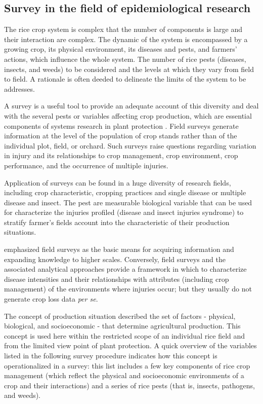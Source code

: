 \subsection*{Survey in the field of epidemiological research}

The rice crop system is complex that the number of components is large and their interaction are complex. The dynamic of the system is encompassed by a growing crop, its physical environment, its diseases and pests, and farmers' actions, which influence the whole system. The number of rice pests (diseases, insects, and weeds) to be considered and the levels at which they vary from field to field. A rationale is often deeded to delineate the limits of the system to be addresses.

A survey is a useful tool to provide an adequate account of this diversity and deal with the several pests or variables affecting crop production, which are essential components of systems research in plant protection \citet{Zadoks_1979_Epidem}. Field surveys generate information at the level of the population of crop stands rather than of the individual plot, field, or orchard. Such surveys raise questions regarding variation in injury and its relationships to crop management, crop environment, crop performance, and the occurrence of multiple injuries.


Application of surveys can be found in a huge diversity of research fields, including crop characteristic, cropping practices and single disease or multiple disease and insect. The pest are measurable biological variable that can be used for characterize the injuries profiled (disease and insect injuries syndrome) to stratify farmer's fields account into the characteristic of their production situations.

\cite{Savary_1995_Use} emphasized field surveys as the basic means for acquiring information and expanding knowledge to higher scales. Conversely, field surveys and the associated analytical approaches provide a framework in which to characterize disease intensities and their relationships with attributes (including crop management) of the environments where injuries occur; but they usually do not generate crop loss data \textit{per se}.


The concept of production situation described the set of factors - physical, biological, and socioeconomic - that determine agricultural production. This concept is used here within the restricted scope of an individual rice field and from the limited view point of plant protection. A quick overview of the variables listed in the following survey procedure indicates how this concept is operationalized in a survey: this list includes a few key components of rice crop management (which reflect the physical and socioeconomic environments of a crop and their interactions) and a series of rice pests (that is, insects, pathogens, and weeds).

